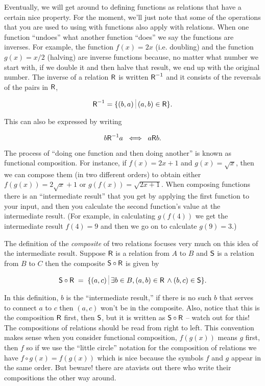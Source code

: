 Eventually, we will get around to defining functions as relations that
have a certain nice property.  For the moment, we'll just note that
some of the operations that you are used to using with functions
also apply with relations.  When one function ``undoes'' what another
function ``does'' we say the functions are inverses.  For example,
the function $f(x)=2x$ (i.e. doubling) and the function $g(x)=x/2$ (halving)
are inverse functions because, no matter what number we start with, if we
double it and then halve that result, we end up with the original number.
The inverse of a relation $\mbox{\textsf R}$ is written $\mbox{\textsf R}^{-1}$ and it consists of
the reversals of the pairs in $\mbox{\textsf R}$,

\[ \relR^{-1} = \{ (b,a) \suchthat (a,b) \in \relR \}. \]

This can also be expressed by writing

\[ b\mbox{\textsf R}^{-1}a \; \iff \; a\mbox{\textsf R} b. \]

The process of ``doing one function and then doing another'' is known
as functional composition.  For instance,
if $f(x) = 2x+1$ and $g(x) = \sqrt{x}$, then we can compose them (in two
different orders) to obtain either $f(g(x)) = 2\sqrt{x}+1$ or 
$g(f(x)) = \sqrt{2x+1}$.  When composing functions there is an ``intermediate
result'' that you get by applying the first function to your input, and then
you calculate the second function's value at the intermediate result.  
(For example, in calculating $g(f(4))$ we get the intermediate result
$f(4) = 9$ and then we go on to calculate $g(9) = 3$.)

The definition of the \emph{composite}
of two relations focuses very much on this idea
of the intermediate result.  Suppose $\mbox{\textsf R}$ is a relation from
$A$ to $B$ and $\mbox{\textsf S}$ is a relation from $B$ to $C$ then the composite
$\mbox{\textsf S} \circ \mbox{\textsf R}$ is given by

\[  \relS \circ \relR \; = \; \{ (a,c) \suchthat \exists b \in B, (a,b) \in \relR \, \land (b,c) \in \relS \}. \]

In this definition, $b$ is the ``intermediate result,'' if there is no such
$b$ that serves to connect $a$ to $c$ then $(a,c)$ won't be in the composite.
Also, notice that this is the composition $\mbox{\textsf R}$ first, then $\mbox{\textsf S}$, but
it is written as $\mbox{\textsf S} \circ \mbox{\textsf R}$  -- watch out for this!  The 
compositions of relations should be read from right to left.  This convention
makes sense when you consider functional composition, $f(g(x))$ means $g$ 
first, then $f$ so if we use the ``little circle'' notation for the
composition of relations we have $f \circ g (x) = f(g(x))$ which is nice
because the symbols $f$ and $g$ appear in the same order.  But beware! there
are atavists out there who write their compositions the other way around.

